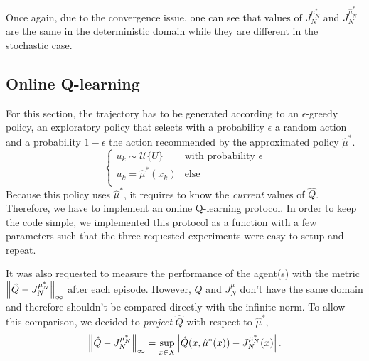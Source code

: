 \documentclass[a4paper, 12pt]{article}
\begin{document}
    Once again, due to the convergence issue, one can see that values of $J^{\mu^*_N}_N$ and $J^{\hat{\mu}^*_N}_N$ are the same in the deterministic domain while they are different in the stochastic case.
    
    \subsection{Online Q-learning}\label{sec:online.q.learning}
    
    For this section, the trajectory has to be generated according to an $\epsilon$-greedy policy, \ie{} an exploratory policy that selects with a probability $\epsilon$ a random action and a probability $1 - \epsilon$ the action recommended by the approximated policy $\hat{\mu}^*$.
    \begin{equation}\label{eq:epsilon-greedy}
        \begin{cases}
            u_k \sim \mathcal{U}\{U\} & \text{with probability } \epsilon \\
            u_k = \hat{\mu}^*(x_k) & \text{else} \\
        \end{cases}
    \end{equation}
    Because this policy uses $\hat{\mu}^*$, it requires to know the \emph{current} values of $\hat{Q}$. Therefore, we have to implement an online Q-learning protocol. In order to keep the code simple, we implemented this protocol as a function with a few parameters such that the three requested experiments were easy to setup and repeat.
    
    It was also requested to measure the performance of the agent(s) with the metric $\left\|\hat{Q} - J^{\mu^*_N}_N\right\|_\infty$ after each episode. However, $Q$ and $J^\mu_N$ don't have the same domain and therefore shouldn't be compared directly with the infinite norm. To allow this comparison, we decided to \emph{project} $\hat{Q}$ with respect to $\hat{\mu}^*$, \ie{}
    \begin{equation}
        \left\|\hat{Q} - J^{\mu^*_N}_N\right\|_\infty = \sup_{x \in X} \left|\hat{Q}(x, \hat{\mu}^*(x)) - J^{\mu^*_N}_N(x)\right| .
    \end{equation}
    
\end{document}
